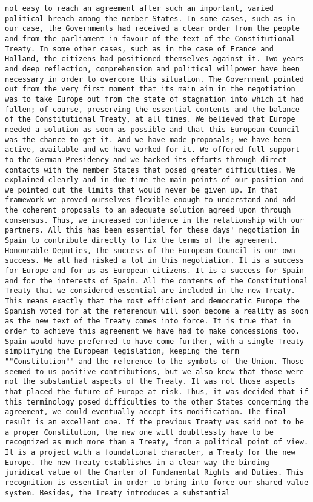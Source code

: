 \documentclass[
]{article}
\begin{document}
\begin{verbatim}
not easy to reach an agreement after such an important, varied political breach among the member States. In some cases, such as in our case, the Governments had received a clear order from the people and from the parliament in favour of the text of the Constitutional Treaty. In some other cases, such as in the case of France and Holland, the citizens had positioned themselves against it. Two years and deep reflection, comprehension and political willpower have been necessary in order to overcome this situation. The Government pointed out from the very first moment that its main aim in the negotiation was to take Europe out from the state of stagnation into which it had fallen; of course, preserving the essential contents and the balance of the Constitutional Treaty, at all times. We believed that Europe needed a solution as soon as possible and that this European Council was the chance to get it. And we have made proposals; we have been active, available and we have worked for it. We offered full support to the German Presidency and we backed its efforts through direct contacts with the member States that posed greater difficulties. We explained clearly and in due time the main points of our position and we pointed out the limits that would never be given up. In that framework we proved ourselves flexible enough to understand and add the coherent proposals to an adequate solution agreed upon through consensus. Thus, we increased confidence in the relationship with our partners. All this has been essential for these days' negotiation in Spain to contribute directly to fix the terms of the agreement. Honourable Deputies, the success of the European Council is our own success. We all had risked a lot in this negotiation. It is a success for Europe and for us as European citizens. It is a success for Spain and for the interests of Spain. All the contents of the Constitutional Treaty that we considered essential are included in the new Treaty. This means exactly that the most efficient and democratic Europe the Spanish voted for at the referendum will soon become a reality as soon as the new text of the Treaty comes into force. It is true that in order to achieve this agreement we have had to make concessions too. Spain would have preferred to have come further, with a single Treaty simplifying the European legislation, keeping the term ""Constitution"" and the reference to the symbols of the Union. Those seemed to us positive contributions, but we also knew that those were not the substantial aspects of the Treaty. It was not those aspects that placed the future of Europe at risk. Thus, it was decided that if this terminology posed difficulties to the other States concerning the agreement, we could eventually accept its modification. The final result is an excellent one. If the previous Treaty was said not to be a proper Constitution, the new one will doubtlessly have to be recognized as much more than a Treaty, from a political point of view. It is a project with a foundational character, a Treaty for the new Europe. The new Treaty establishes in a clear way the binding juridical value of the Charter of Fundamental Rights and Duties. This recognition is essential in order to bring into force our shared value system. Besides, the Treaty introduces a substantial 
\end{verbatim}
\end{document}
